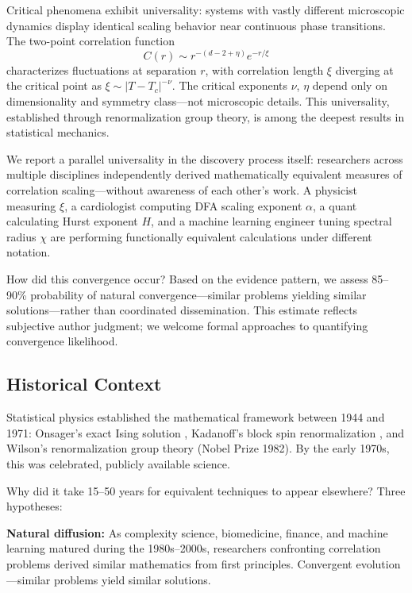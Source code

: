 \documentclass[11pt]{article}
\begin{document}
Critical phenomena exhibit universality: systems with vastly different microscopic dynamics display identical scaling behavior near continuous phase transitions. The two-point correlation function
\begin{equation}
C(r) \sim r^{-(d-2+\eta)} e^{-r/\xi}
\end{equation}
characterizes fluctuations at separation $r$, with correlation length $\xi$ diverging at the critical point as $\xi \sim |T-T_c|^{-\nu}$. The critical exponents $\nu$, $\eta$ depend only on dimensionality and symmetry class---not microscopic details. This universality, established through renormalization group theory, is among the deepest results in statistical mechanics.

We report a parallel universality in the discovery process itself: researchers across multiple disciplines independently derived mathematically equivalent measures of correlation scaling---without awareness of each other's work. A physicist measuring $\xi$, a cardiologist computing DFA scaling exponent $\alpha$, a quant calculating Hurst exponent $H$, and a machine learning engineer tuning spectral radius $\chi$ are performing functionally equivalent calculations under different notation.

How did this convergence occur? Based on the evidence pattern, we assess 85--90\% probability of natural convergence---similar problems yielding similar solutions---rather than coordinated dissemination. This estimate reflects subjective author judgment; we welcome formal approaches to quantifying convergence likelihood.

\subsection{Historical Context}

Statistical physics established the mathematical framework between 1944 and 1971: Onsager's exact Ising solution \cite{onsager1944}, Kadanoff's block spin renormalization \cite{kadanoff1966}, and Wilson's renormalization group theory \cite{wilson1971} (Nobel Prize 1982). By the early 1970s, this was celebrated, publicly available science.

Why did it take 15--50 years for equivalent techniques to appear elsewhere? Three hypotheses:

\textbf{Natural diffusion:} As complexity science, biomedicine, finance, and machine learning matured during the 1980s--2000s, researchers confronting correlation problems derived similar mathematics from first principles. Convergent evolution---similar problems yield similar solutions.
\end{document}
